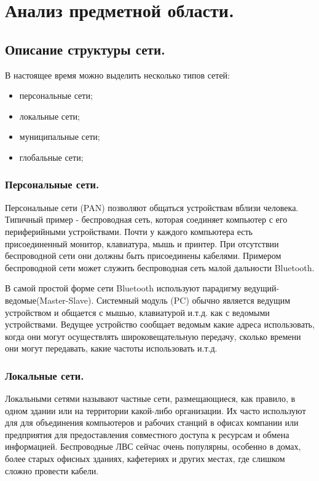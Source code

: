 \documentclass[12pt]{report}
\begin{document}
\newpage

    \section{Анализ предметной области.}
    \subsection{Описание структуры сети.}

    В настоящее время можно выделить несколько типов сетей:
    \begin{itemize}
        \item персональные сети;
        \item локальные сети;
        \item муниципальные сети;
        \item глобальные сети;
    \end{itemize}

    \subsubsection{Персональные сети. }

    Персональные сети (PAN) позволяют общаться устройствам вблизи человека. Типичный пример - беспроводная сеть, которая соединяет компьютер с его периферийными устройствами. Почти у каждого компьютера есть присоединенный монитор, клавиатура, мышь и принтер. При отсутствии беспроводной сети они должны быть присоединены кабелями. Примером беспроводной сети может служить беспроводная сеть малой дальности Bluetooth.

    В самой простой форме сети Bluetooth используют парадигму ведущий-ведомые(Master-Slave). Системный модуль (PC) обычно является ведущим устройством и общается с мышью, клавиатурой и.т.д. как с ведомыми устройствами. Ведущее устройство сообщает ведомым какие адреса использовать, когда они могут осуществлять широковещательную передачу, сколько времени они могут передавать, какие частоты использовать и.т.д.

    \subsubsection{Локальные сети.}
    Локальными сетями называют частные сети, размещающиеся, как правило, в одном здании или на территории какой-либо организации. Их часто используют для для объединения компьютеров и рабочих станций в офисах компании или предприятия для предоставления совместного доступа к ресурсам и обмена информацией. Беспроводные ЛВС сейчас очень популярны, особенно в домах, более старых офисных зданиях, кафетериях и других местах, где слишком сложно провести кабели.
\end{document}
